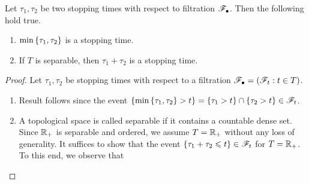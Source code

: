 \documentclass[a4paper,10pt,english]{article}
\begin{document}
\begin{lem}
Let $\tau_1,\tau_2$ be two stopping times with respect to filtration $\mathscr{F}_\bullet$.  
Then the following hold true. 
\begin{enumerate}[i\_]
\item $\min \left\{\tau_1,\tau_2\right\} $ is a stopping time. 
\item If $T$ is separable, then $\tau_1+\tau_2$ is a stopping time.
\end{enumerate}
\end{lem}
\begin{proof}
Let $\tau_1,\tau_2$ be stopping times with respect to a filtration $\mathscr{F}_{\bullet} = (\mathscr{F}_t : t \in T)$.  
\begin{enumerate}[i\_]
\item Result follows since the event $\left\{ \min \left\{ \tau_1,\tau_2\right\} > t\right\} = \left\{\tau_1 > t\right\} \cap \left\{\tau_2 > t\right\} \in \mathscr{F}_t$. 
\item A topological space is called separable if it contains a countable dense set. 
Since $\mathbb{R}_+$ is separable and ordered, we assume $T = \mathbb{R}_+$ without any loss of generality. 
It suffices to show that the event $\left\{\tau_1+\tau_2 \leqslant  t\right\} \in \mathscr{F}_t$ for $T = \mathbb{R}_+$. 
To this end, we observe that 
\end{enumerate}
\end{proof}
\end{document}
